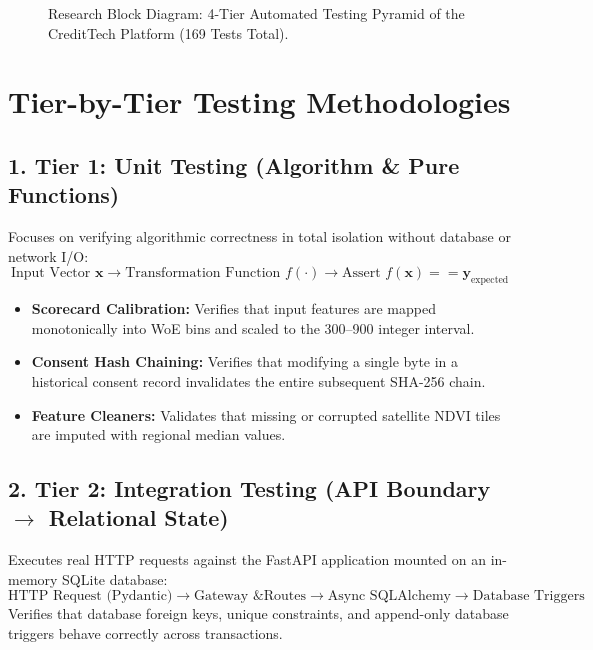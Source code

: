\documentclass[11pt,a4paper,oneside]{report}
\begin{document}
\begin{figure}[H]
\caption{Research Block Diagram: 4-Tier Automated Testing Pyramid of the CreditTech Platform (169 Tests Total).}
\label{fig:testing_pyramid}
\end{figure}

\section{Tier-by-Tier Testing Methodologies}

\subsection{1. Tier 1: Unit Testing (Algorithm \& Pure Functions)}
Focuses on verifying algorithmic correctness in total isolation without database or network I/O:
$$\text{Input Vector } \mathbf{x} \longrightarrow \text{Transformation Function } f(\cdot) \longrightarrow \text{Assert } f(\mathbf{x}) == \mathbf{y}_{\text{expected}}$$
\begin{itemize}
  \item \textbf{Scorecard Calibration:} Verifies that input features are mapped monotonically into WoE bins and scaled to the 300--900 integer interval.
  \item \textbf{Consent Hash Chaining:} Verifies that modifying a single byte in a historical consent record invalidates the entire subsequent SHA-256 chain.
  \item \textbf{Feature Cleaners:} Validates that missing or corrupted satellite NDVI tiles are imputed with regional median values.
\end{itemize}

\subsection{2. Tier 2: Integration Testing (API Boundary $\rightarrow$ Relational State)}
Executes real HTTP requests against the FastAPI application mounted on an in-memory SQLite database:
$$\text{HTTP Request (Pydantic)} \longrightarrow \text{Gateway \& Routes} \longrightarrow \text{Async SQLAlchemy} \longrightarrow \text{Database Triggers}$$
Verifies that database foreign keys, unique constraints, and append-only database triggers behave correctly across transactions.
\end{document}
